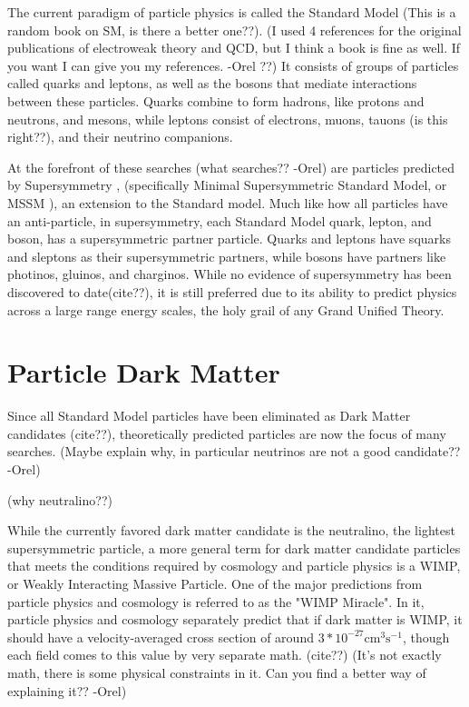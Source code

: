   The current paradigm of particle physics is called the Standard Model \cite{standardmodel} {\color{red}(This is a random book on SM, is there a better one??)}.
  {\color{red}(I used 4 references for the original publications of electroweak theory and QCD, but I think a book is fine as well. If you want I can give you my references. -Orel ??)}
  It consists of groups of particles called quarks and leptons, as well as the bosons that mediate interactions between these particles.
  Quarks combine to form hadrons, like protons and neutrons, and mesons, while leptons consist of electrons, muons, {\color{red}tauons (is this right??)}, and their neutrino companions.

  At the forefront of {\color{red}these searches (what searches?? -Orel)} are particles predicted by Supersymmetry \cite{Jungman:1995df}, (specifically Minimal Supersymmetric Standard Model, or MSSM \cite{MSSM}), an extension to the Standard model.
  Much like how all particles have an anti-particle, in supersymmetry, each Standard Model quark, lepton, and boson, has a supersymmetric partner particle.
  Quarks and leptons have squarks and sleptons as their supersymmetric partners, while bosons have partners like photinos, gluinos, and charginos.
  While no evidence of supersymmetry has been discovered to date{\color{red}(cite??)}, it is still preferred due to its ability to predict physics across a large range energy scales, the holy grail of any Grand Unified Theory.
  

\section{Particle Dark Matter}

  Since all Standard Model particles have been eliminated as Dark Matter candidates {\color{red}(cite??)}, theoretically predicted particles are now the focus of many searches.
  {\color{red}(Maybe explain why, in particular neutrinos are not a good candidate?? -Orel)}

  {\color{red}(why neutralino??)}
  
  While the currently favored dark matter candidate is the neutralino, the lightest supersymmetric particle, a more general term for dark matter candidate particles that meets the conditions required by cosmology and particle physics is a WIMP, or Weakly Interacting Massive Particle.
  One of the major predictions from particle physics and cosmology is referred to as the "WIMP Miracle".
  In it, particle physics and cosmology separately predict that if dark matter is WIMP, it should have a velocity-averaged cross section of around $3*10^{-27}\text{cm}^{3}\text{s}^{-1}$, though each field comes to this value by very separate math. {\color{red}(cite??)}
  {\color{red}(It’s not exactly math, there is some physical constraints in it. Can you find a better way of explaining it?? -Orel)}

